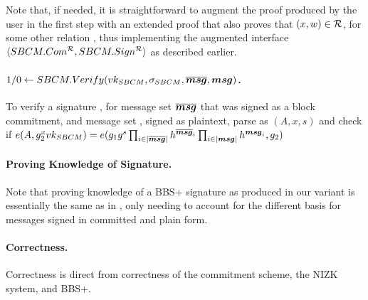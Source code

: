 Note that, if needed, it is straightforward to augment the proof \NIZKproof
produced by the user in the first step with an extended proof that also proves
that $(x,w) \in \mathcal{R}$, for some other relation \NIZKRel, thus implementing
the augmented interface $\langle SBCM.Com^\mathcal{R},SBCM.Sign^\mathcal{R}\rangle$ as
described earlier.

\paragraph{$1/0 \gets SBCM.Verify(vk_{SBCM},\sigma_{SBCM},\overline{\boldsymbol{msg}},\boldsymbol{msg})$.} %
To verify a signature \SBCMsig, for message set $\overline{\boldsymbol{msg}}$ that was
signed as a block commitment, and message set \smsg, signed as plaintext, parse
\SBCMsig as $(A,x,s)$ and check if $e(A,g_2^xvk_{SBCM}) =
e(g_1g^s\prod_{i \in |\overline{\boldsymbol{msg}}|}h^{\overline{\boldsymbol{msg}}_i}
\prod_{i \in |\boldsymbol{msg}|}h^{\boldsymbol{msg}_i},g_2)$

\paragraph{Proving Knowledge of Signature.} %
Note that proving knowledge of a BBS+ signature as produced in our \SBCM variant
is essentially the same as in \cite{asm06,cdl16b}, only needing to account for
the different basis for messages signed in committed and plain form.

\paragraph{Correctness.} Correctness is direct from correctness of the
commitment scheme, the NIZK system, and BBS+.

